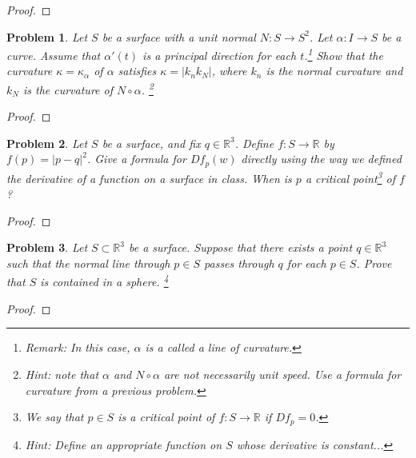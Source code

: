 \documentclass[11pt]{article}
\newtheorem{problem}{Problem}
\begin{document}
\begin{proof}

\end{proof}

\pagebreak

\begin{problem}
Let $S$ be a surface with a unit normal $N:S\to S^2$. Let $\alpha:I\to S$ be a curve. 
Assume that $\alpha'(t)$ is a principal direction for each $t$.\footnote{Remark: In this case, $\alpha$ is a called a \emph{line of curvature}.}  Show that the curvature $\kappa=\kappa_\alpha$ of $\alpha$ satisfies $\kappa=|k_nk_N|$, where $k_n$ is the normal curvature and $k_N$ is the curvature of $N\circ\alpha$. \footnote{Hint: note that $\alpha$ and $N\circ\alpha$ are not necessarily unit speed. Use a formula for curvature from a previous problem.} 
\end{problem}

\begin{proof}

\end{proof}

\pagebreak

\begin{problem}
Let $S$ be a surface, and fix $q\in\mathbb R^3$. Define $f:S\to\mathbb R$ by $f(p)=|p-q|^2$. Give a formula for $Df_p(w)$ directly using the way we defined the derivative of a function on a surface in class. When is $p$ a critical point\footnote{We say that $p\in S$ is a critical point of $f:S\to\mathbb R$ if $Df_p=0$.}  of $f$? 
\end{problem}

\begin{proof}

\end{proof}

\pagebreak

\begin{problem}
Let $S\subset\mathbb R^3$ be a surface. Suppose that there exists a point $q\in\mathbb R^3$ such that the normal line through $p\in S$ passes through $q$ for each $p\in S$. Prove that $S$ is contained in a sphere. \footnote{Hint: Define an appropriate function on $S$ whose derivative is constant...}
\end{problem}

\begin{proof}

\end{proof}
\end{document}
